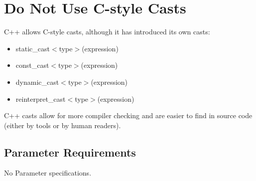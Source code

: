 %
%

\section{Do Not Use C-style Casts}
\label{DoNotUseCstyleCasts::overview}


C++ allows C-style casts, although it has introduced its own casts:

\begin{itemize}
\item{static\_cast$<$type$>$(expression)}
\item{const\_cast$<$type$>$(expression)}
\item{dynamic\_cast$<$type$>$(expression)}
\item{reinterpret\_cast$<$type$>$(expression)}
\end{itemize}

C++ casts allow for more compiler checking and are easier to find in source code
(either by tools or by human readers).

\subsection{Parameter Requirements}

   No Parameter specifications.

